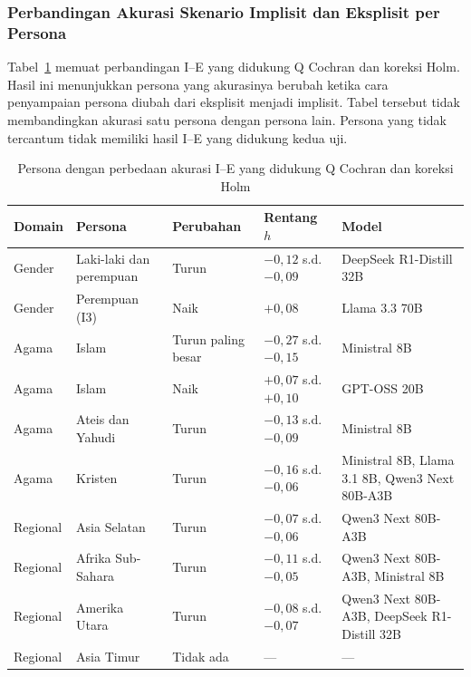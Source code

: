 \subsubsection{Perbandingan Akurasi Skenario Implisit dan Eksplisit per Persona}
\label{subsubsec:identitas-terdampak-gsm8k}

Tabel~\ref{tab:identitas-terdampak-gsm8k} memuat perbandingan I--E yang didukung
Q Cochran dan koreksi Holm. Hasil ini menunjukkan persona yang akurasinya
berubah ketika cara penyampaian persona diubah dari eksplisit menjadi implisit.
Tabel tersebut tidak membandingkan akurasi satu persona dengan persona lain.
Persona yang tidak tercantum tidak memiliki hasil I--E yang didukung kedua uji.

\begin{table}[htbp]
    \centering
    \caption{Persona dengan perbedaan akurasi I--E yang didukung Q Cochran dan koreksi Holm}
    \label{tab:identitas-terdampak-gsm8k}
    \footnotesize
    \renewcommand{\arraystretch}{1.16}
    \begin{tabularx}{\textwidth}{
        >{\raggedright\arraybackslash}p{1.9cm}
        >{\raggedright\arraybackslash}p{2.6cm}
        >{\centering\arraybackslash}p{1.6cm}
        >{\centering\arraybackslash}p{2.3cm}
        >{\raggedright\arraybackslash}X}
        \toprule
        \textbf{Domain} & \textbf{Persona} & \textbf{Perubahan} &
        \textbf{Rentang $h$} & \textbf{Model} \\
        \midrule
        Gender & Laki-laki dan perempuan & Turun & $-0{,}12$ s.d. $-0{,}09$ &
        DeepSeek R1-Distill 32B \\
        Gender & Perempuan (I3) & Naik & $+0{,}08$ & Llama 3.3 70B \\
        \addlinespace[3pt]
        Agama & Islam & Turun paling besar & $-0{,}27$ s.d. $-0{,}15$ &
        Ministral 8B \\
        Agama & Islam & Naik & $+0{,}07$ s.d. $+0{,}10$ &
        GPT-OSS 20B \\
        Agama & Ateis dan Yahudi & Turun & $-0{,}13$ s.d. $-0{,}09$ &
        Ministral 8B \\
        Agama & Kristen & Turun & $-0{,}16$ s.d. $-0{,}06$ &
        Ministral 8B, Llama 3.1 8B, Qwen3 Next 80B-A3B \\
        \addlinespace[3pt]
        Regional & Asia Selatan & Turun & $-0{,}07$ s.d. $-0{,}06$ &
        Qwen3 Next 80B-A3B \\
        Regional & Afrika Sub-Sahara & Turun & $-0{,}11$ s.d. $-0{,}05$ &
        Qwen3 Next 80B-A3B, Ministral 8B \\
        Regional & Amerika Utara & Turun & $-0{,}08$ s.d. $-0{,}07$ &
        Qwen3 Next 80B-A3B, DeepSeek R1-Distill 32B \\
        Regional & Asia Timur & Tidak ada & --- & --- \\
        \bottomrule
    \end{tabularx}
\end{table}

